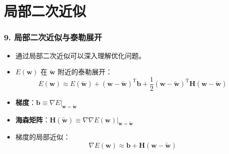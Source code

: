 \documentclass[t,aspectratio=169]{beamer} %
\begin{document}
\section{局部二次近似}

\begin{frame}
    \frametitle{9. 局部二次近似与泰勒展开}
    \begin{itemize}
        \item 通过局部二次近似可以深入理解优化问题。
        \item $E(\mathbf{w})$ 在 $\tilde{\mathbf{w}}$ 附近的泰勒展开：
        \begin{equation}
        E(\mathbf{w}) \approx E(\tilde{\mathbf{w}}) + (\mathbf{w} - \tilde{\mathbf{w}})^\mathrm{T} \mathbf{b} + \frac{1}{2} (\mathbf{w} - \tilde{\mathbf{w}})^\mathrm{T} \mathbf{H} (\mathbf{w} - \tilde{\mathbf{w}})
        \tag{7.3}
        \end{equation}
        \item \textbf{梯度}：$\mathbf{b} \equiv \left.\nabla E\right|_{\mathbf{w} = \tilde{\mathbf{w}}}$
        \item \textbf{海森矩阵}：$\mathbf{H}(\tilde{\mathbf{w}}) \equiv \left.\nabla\nabla E(\mathbf{w})\right|_{\mathbf{w} = \tilde{\mathbf{w}}}$
        \item 梯度的局部近似：
        \begin{equation}
        \nabla E(\mathbf{w}) \approx \mathbf{b} + \mathbf{H}(\mathbf{w} - \tilde{\mathbf{w}})
        \tag{7.6}
        \end{equation}
    \end{itemize}
\end{frame}
\end{document}

